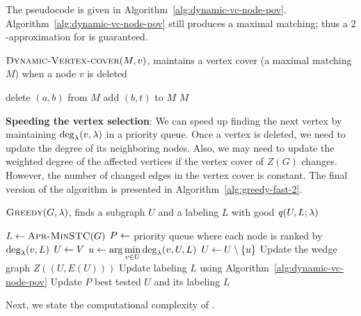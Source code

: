 The pseudocode is given in Algorithm~\ref{alg:dynamic-vc-node-pov}.
Algorithm~\ref{alg:dynamic-vc-node-pov} still produces a maximal matching; thus a $2$-approximation for \prbcovermin is guaranteed.


\begin{algorithm}[t!]
\caption{$\textsc{Dynamic-Vertex-cover}(M,  v)$, maintains a vertex cover (a maximal matching $M$) when a node $v$ is deleted}
\label{alg:dynamic-vc-node-pov}
     {
         {
            delete $(a, b)$ from $M$\;
             {
                add $(b, t)$ to $M$\;
            }
        }
    }
    \Return $M$\;
\end{algorithm}

\textbf{Speeding the vertex selection}:
We can speed up finding the next vertex by maintaining $\scorev{v, \lambda}$ in a priority queue.
Once a vertex is deleted, we need to update the degree of its neighboring nodes. Also, we may need to update the weighted degree of the affected vertices if the vertex cover of $Z(G)$ changes. However, the number of changed edges in the vertex cover is constant.
The final version of the algorithm is presented in Algorithm~\ref{alg:greedy-fast-2}. 

\begin{algorithm}[ht!]
\caption{$\textsc{Greedy}(G, \lambda)$, finds a subgraph $U$ and a labeling $L$ with good $\score{U, L; \lambda}$}
\label{alg:greedy-fast-2}
    $L \leftarrow \textsc{Apr-MinSTC}(G)$\;
    $P \leftarrow$ priority queue where each node is ranked by $\scorev{v, L}$\;
    $U \leftarrow V$\;
     {
	$u \define \displaystyle\arg\min_{ v \in U} \scorev{v, U, L} \label{alg:score-step-pq}$\;
        $U \leftarrow U \setminus \left\{u\right\}$\;
        Update the wedge graph $Z((U, E(U)))$\;
        Update labeling $L$ using Algorithm~\ref{alg:dynamic-vc-node-pov}\;
        Update $P$\;
    }
    \Return best tested $U$ and its labeling $L$\;
\end{algorithm}

Next, we state the computational complexity of \alggreedyfastest.

